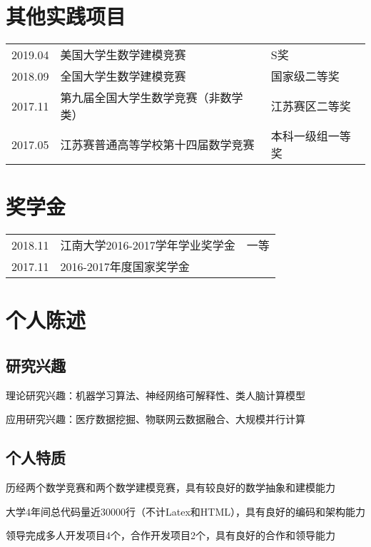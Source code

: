 \documentclass[]{deedy-resume-openfont}
\begin{document}
\begin{minipage}[t]{0.73\textwidth}
	\section{其他实践项目}
    \begin{tabular}{lll}
        2019.04 & 美国大学生数学建模竞赛 & S奖 \\
        2018.09 & 全国大学生数学建模竞赛 & 国家级二等奖 \\
        2017.11 & 第九届全国大学生数学竞赛（非数学类） & 江苏赛区二等奖 \\
        2017.05 & 江苏赛普通高等学校第十四届数学竞赛 & 本科一级组一等奖\\
	\end{tabular}
    \sectionsep

	\section{奖学金}
    \begin{tabular}{lll}
        2018.11 & 江南大学2016-2017学年学业奖学金 & 一等 \\
        2017.11 & 2016-2017年度国家奖学金 & \\
	\end{tabular}
    \sectionsep
    
    \section{个人陈述}
    \subsection{研究兴趣}
    \vspace{\topsep}
	\begin{tightemize}
		\item 理论研究兴趣：机器学习算法、神经网络可解释性、类人脑计算模型
		\item 应用研究兴趣：医疗数据挖掘、物联网云数据融合、大规模并行计算
	\end{tightemize}
    \subsection{个人特质}
    \vspace{\topsep}
    \begin{tightemize}
        \item 历经两个数学竞赛和两个数学建模竞赛，具有较良好的数学抽象和建模能力
		\item 大学4年间总代码量近30000行（不计Latex和HTML），具有良好的编码和架构能力
		\item 领导完成多人开发项目4个，合作开发项目2个，具有良好的合作和领导能力
	\end{tightemize}
\end{minipage}
\end{document}
